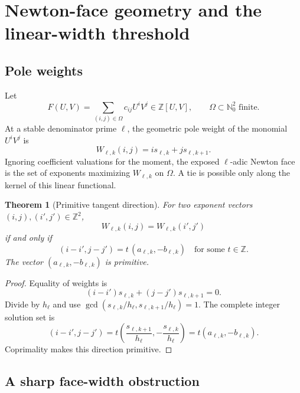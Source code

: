 \documentclass[11pt,oneside]{article}
\newtheorem{theorem}{Theorem}[section]
\theoremstyle{definition}
\theoremstyle{remark}
\newcommand{\Nzero}{\mathbb N_0}
\newcommand{\Z}{\mathbb Z}
\begin{document}
\section{Newton-face geometry and the linear-width threshold}
\label{sec:newton}

\subsection{Pole weights}

Let
\begin{equation}
 F(U,V)=\sum_{(i,j)\in\Omega}c_{ij}U^iV^j
 \in\Z[U,V],
 \qquad \Omega\subset\Nzero^2\text{ finite}.
 \label{eq:F}
\end{equation}
At a stable denominator prime $\ell$, the geometric pole weight of the monomial $U^iV^j$ is
\begin{equation}
 W_{\ell,k}(i,j)=i s_{\ell,k}+j s_{\ell,k+1}.
 \label{eq:pole-weight}
\end{equation}
Ignoring coefficient valuations for the moment, the exposed $\ell$-adic Newton face is the
set of exponents maximizing $W_{\ell,k}$ on $\Omega$.  A tie is possible only along the
kernel of this linear functional.

\begin{theorem}[Primitive tangent direction]
\label{thm:primitive-tangent}
For two exponent vectors $(i,j),(i',j')\in\Z^2$,
\begin{equation}
 W_{\ell,k}(i,j)=W_{\ell,k}(i',j')
 \label{eq:equal-weight}
\end{equation}
if and only if
\begin{equation}
 (i-i',j-j')=t\,(a_{\ell,k},-b_{\ell,k})
 \quad\text{for some }t\in\Z.
 \label{eq:tangent-direction}
\end{equation}
The vector $(a_{\ell,k},-b_{\ell,k})$ is primitive.
\end{theorem}

\begin{proof}
Equality of weights is
\[
 (i-i')s_{\ell,k}+(j-j')s_{\ell,k+1}=0.
\]
Divide by $h_\ell$ and use
$\gcd(s_{\ell,k}/h_\ell,s_{\ell,k+1}/h_\ell)=1$.  The complete integer solution set is
\[
 (i-i',j-j')
 =t\left(\frac{s_{\ell,k+1}}{h_\ell},
          -\frac{s_{\ell,k}}{h_\ell}\right)
 =t(a_{\ell,k},-b_{\ell,k}).
\]
Coprimality makes this direction primitive.
\end{proof}

\subsection{A sharp face-width obstruction}
\end{document}
